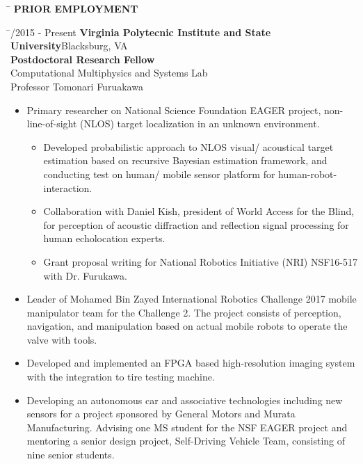 \documentclass[11pt,letter]{article}
\begin{document}
\begin{tabbing}
	\hspace{3cm}\=\kill
	\>  {\bf PRIOR EMPLOYMENT}
\end{tabbing}
\begin{tabbing}
	\hspace{3cm} \= /2015 - Present \> {\bf Virginia Polytecnic Institute and State University}\hfill{Blacksburg, VA }\\
	\> {\bfseries Postdoctoral Research Fellow}\\
	\>	Computational Multiphysics and Systems Lab\\
	\> Professor Tomonari Furuakawa\\
	\> \hspace{-1cm}\begin{minipage}{0.9\textwidth}
			\begin{itemize}
				\item Primary researcher on National Science Foundation EAGER project, non-line-of-sight (NLOS) target localization in an unknown environment.
				\begin{itemize}
					\item Developed probabilistic approach to NLOS visual/ acoustical target estimation based on recursive Bayesian estimation framework, and conducting test on human/ mobile sensor platform for human-robot-interaction.
					\item Collaboration with Daniel Kish, president of World Access for the Blind, for perception of acoustic diffraction and reflection signal processing for human echolocation experts.
					\item Grant proposal writing for National Robotics Initiative (NRI) NSF16-517 with Dr. Furukawa.
				\end{itemize}
				\item Leader of Mohamed Bin Zayed International Robotics Challenge 2017 mobile manipulator team for the Challenge 2. The project consists of perception, navigation, and manipulation based on actual mobile robots to operate the valve with tools.
				\item Developed and implemented an FPGA based high-resolution imaging system with the integration to tire testing machine.
				\item Developing an autonomous car and associative technologies including new sensors for a project sponsored by General Motors and Murata Manufacturing. Advising one MS student for the NSF EAGER project and mentoring a senior design project, Self-Driving Vehicle Team, consisting of nine senior students.
			\end{itemize}
	\end{minipage}

\end{tabbing}
\end{document}
